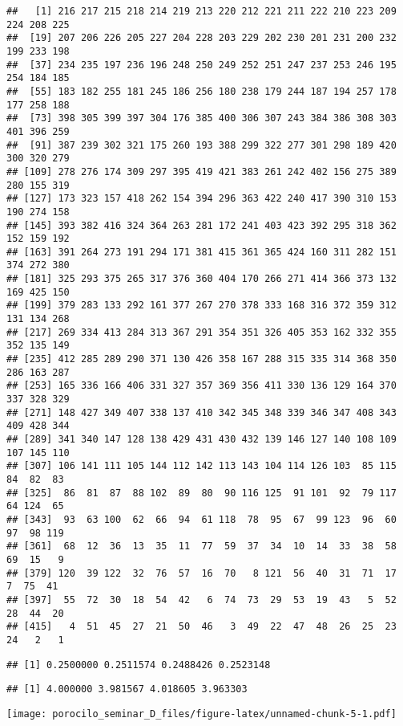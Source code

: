 \documentclass[
]{article}
\begin{document}
\begin{verbatim}
##   [1] 216 217 215 218 214 219 213 220 212 221 211 222 210 223 209 224 208 225
##  [19] 207 206 226 205 227 204 228 203 229 202 230 201 231 200 232 199 233 198
##  [37] 234 235 197 236 196 248 250 249 252 251 247 237 253 246 195 254 184 185
##  [55] 183 182 255 181 245 186 256 180 238 179 244 187 194 257 178 177 258 188
##  [73] 398 305 399 397 304 176 385 400 306 307 243 384 386 308 303 401 396 259
##  [91] 387 239 302 321 175 260 193 388 299 322 277 301 298 189 420 300 320 279
## [109] 278 276 174 309 297 395 419 421 383 261 242 402 156 275 389 280 155 319
## [127] 173 323 157 418 262 154 394 296 363 422 240 417 390 310 153 190 274 158
## [145] 393 382 416 324 364 263 281 172 241 403 423 392 295 318 362 152 159 192
## [163] 391 264 273 191 294 171 381 415 361 365 424 160 311 282 151 374 272 380
## [181] 325 293 375 265 317 376 360 404 170 266 271 414 366 373 132 169 425 150
## [199] 379 283 133 292 161 377 267 270 378 333 168 316 372 359 312 131 134 268
## [217] 269 334 413 284 313 367 291 354 351 326 405 353 162 332 355 352 135 149
## [235] 412 285 289 290 371 130 426 358 167 288 315 335 314 368 350 286 163 287
## [253] 165 336 166 406 331 327 357 369 356 411 330 136 129 164 370 337 328 329
## [271] 148 427 349 407 338 137 410 342 345 348 339 346 347 408 343 409 428 344
## [289] 341 340 147 128 138 429 431 430 432 139 146 127 140 108 109 107 145 110
## [307] 106 141 111 105 144 112 142 113 143 104 114 126 103  85 115  84  82  83
## [325]  86  81  87  88 102  89  80  90 116 125  91 101  92  79 117  64 124  65
## [343]  93  63 100  62  66  94  61 118  78  95  67  99 123  96  60  97  98 119
## [361]  68  12  36  13  35  11  77  59  37  34  10  14  33  38  58  69  15   9
## [379] 120  39 122  32  76  57  16  70   8 121  56  40  31  71  17   7  75  41
## [397]  55  72  30  18  54  42   6  74  73  29  53  19  43   5  52  28  44  20
## [415]   4  51  45  27  21  50  46   3  49  22  47  48  26  25  23  24   2   1
\end{verbatim}

\begin{verbatim}
## [1] 0.2500000 0.2511574 0.2488426 0.2523148
\end{verbatim}

\begin{verbatim}
## [1] 4.000000 3.981567 4.018605 3.963303
\end{verbatim}

\texttt{[image: porocilo\_seminar\_D\_files/figure-latex/unnamed-chunk-5-1.pdf]}
\end{document}
